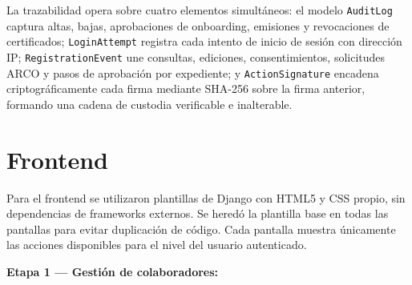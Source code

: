 \documentclass[10pt,letterpaper]{report}
\begin{document}
La trazabilidad opera sobre cuatro elementos simultáneos: el modelo \texttt{AuditLog} captura altas, bajas, aprobaciones de onboarding, emisiones y revocaciones de certificados; \texttt{LoginAttempt} registra cada intento de inicio de sesión con dirección IP; \texttt{RegistrationEvent} une consultas, ediciones, consentimientos, solicitudes ARCO y pasos de aprobación por expediente; y \texttt{ActionSignature} encadena criptográficamente cada firma mediante SHA-256 sobre la firma anterior, formando una cadena de custodia verificable e inalterable.

\section{Frontend}

Para el frontend se utilizaron plantillas de Django con HTML5 y CSS propio, sin dependencias de frameworks externos. Se heredó la plantilla base en todas las pantallas para evitar duplicación de código. Cada pantalla muestra únicamente las acciones disponibles para el nivel del usuario autenticado.

\textbf{Etapa 1 --- Gestión de colaboradores:}
\end{document}
